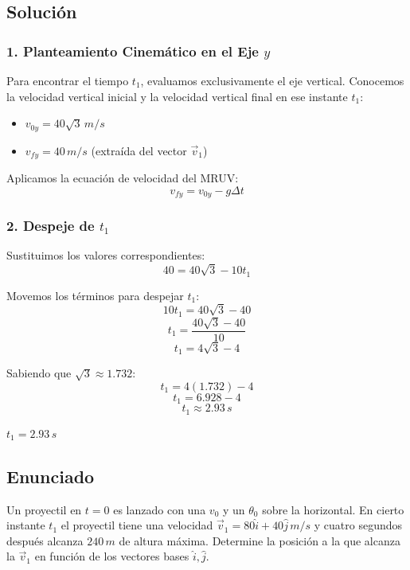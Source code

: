 \documentclass[12pt, a4paper]{article}
\begin{document}
\subsection*{Solución}

\subsubsection*{1. Planteamiento Cinemático en el Eje $y$}
Para encontrar el tiempo $t_1$, evaluamos exclusivamente el eje vertical. Conocemos la velocidad vertical inicial y la velocidad vertical final en ese instante $t_1$:
\begin{itemize}
    \item $v_{0y} = 40\sqrt{3} \, \si{m/s}$
    \item $v_{fy} = 40 \, \si{m/s}$ (extraída del vector $\vec{v}_1$)
\end{itemize}

Aplicamos la ecuación de velocidad del MRUV:
$$ v_{fy} = v_{0y} - g \Delta t $$

\subsubsection*{2. Despeje de $t_1$}
Sustituimos los valores correspondientes:
$$ 40 = 40\sqrt{3} - 10 t_1 $$

Movemos los términos para despejar $t_1$:
$$ 10 t_1 = 40\sqrt{3} - 40 $$
$$ t_1 = \frac{40\sqrt{3} - 40}{10} $$
$$ t_1 = 4\sqrt{3} - 4 $$

Sabiendo que $\sqrt{3} \approx 1.732$:
$$ t_1 = 4(1.732) - 4 $$
$$ t_1 = 6.928 - 4 $$
$$ t_1 \approx 2.93 \, \si{s} $$

\begin{tcolorbox}[colback=green!5!white, colframe=green!50!black, title=Respuesta Final]
\centering \Large $t_1 = 2.93 \, \si{s}$
\end{tcolorbox}

\newpage

\subsection*{Enunciado}
Un proyectil en $t = 0$ es lanzado con una $v_0$ y un $\theta_0$ sobre la horizontal. En cierto instante $t_1$ el proyectil tiene una velocidad $\vec{v}_1 = 80\hat{i} + 40\hat{j} \, \si{m/s}$ y cuatro segundos después alcanza $240 \, \si{m}$ de altura máxima. Determine la posición a la que alcanza la $\vec{v}_1$ en función de los vectores bases $\hat{i}, \hat{j}$.
\end{document}
